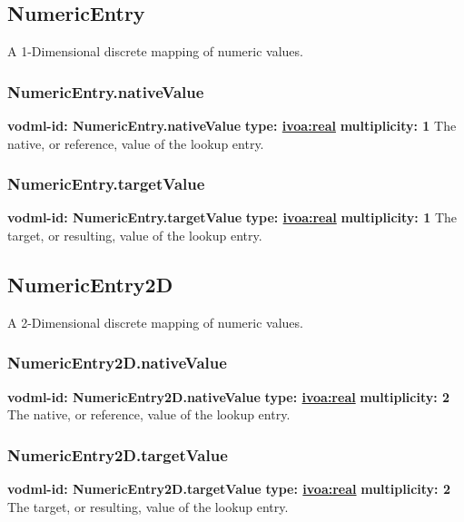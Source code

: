   \subsection{NumericEntry}
  \label{sect:NumericEntry}
    A 1-Dimensional discrete mapping of numeric values.

    \subsubsection{NumericEntry.nativeValue}
      \textbf{vodml-id: NumericEntry.nativeValue} \newline
      \textbf{type: \hyperref[sect:ivoa]{ivoa:real}} \newline
      \textbf{multiplicity: 1} \newline 
      The native, or reference, value of the lookup entry.

    \subsubsection{NumericEntry.targetValue}
      \textbf{vodml-id: NumericEntry.targetValue} \newline
      \textbf{type: \hyperref[sect:ivoa]{ivoa:real}} \newline
      \textbf{multiplicity: 1} \newline 
      The target, or resulting, value of the lookup entry.

  \subsection{NumericEntry2D}
  \label{sect:NumericEntry2D}
    A 2-Dimensional discrete mapping of numeric values.

    \subsubsection{NumericEntry2D.nativeValue}
      \textbf{vodml-id: NumericEntry2D.nativeValue} \newline
      \textbf{type: \hyperref[sect:ivoa]{ivoa:real}} \newline
      \textbf{multiplicity: 2} \newline 
      The native, or reference, value of the lookup entry.

    \subsubsection{NumericEntry2D.targetValue}
      \textbf{vodml-id: NumericEntry2D.targetValue} \newline
      \textbf{type: \hyperref[sect:ivoa]{ivoa:real}} \newline
      \textbf{multiplicity: 2} \newline 
      The target, or resulting, value of the lookup entry.

